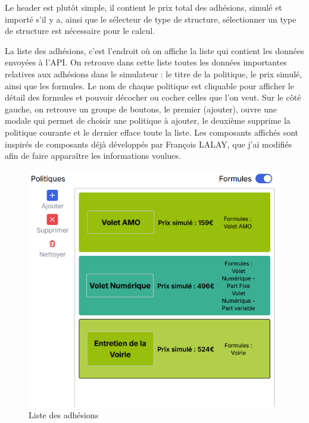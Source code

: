 \documentclass[a4paper,12pt]{report}
\begin{document}
\vspace{1em}

Le header est plutôt simple, il contient le prix total des adhésions, simulé et importé s'il y a, ainsi que le sélecteur de type de structure, sélectionner un type de structure est nécessaire pour le calcul.

\vspace{1em}

La liste des adhésions, c'est l'endroit où on affiche la liste qui contient les données envoyées à l'API. On retrouve dans cette liste toutes les données importantes relatives aux adhésions dans le simulateur : le titre de la politique, le prix simulé, ainsi que les formules. Le nom de chaque politique est cliquable pour afficher le détail des formules et pouvoir décocher ou cocher celles que l'on veut. Sur le côté gauche, on retrouve un groupe de boutons, le premier (ajouter), ouvre une modale qui permet de choisir une politique à ajouter, le deuxième supprime la politique courante et le dernier efface toute la liste. Les composants affichés sont inspirés de composants déjà développés par François LALAY, que j'ai modifiés afin de faire apparaître les informations voulues.

\begin{figure}[H]
    \centering
    \includegraphics[scale=0.7]{adhesionList.png}
    \caption{Liste des adhésions}
    \label{fig:list-adhe}
\end{figure}
\vspace{1em}
\end{document}
